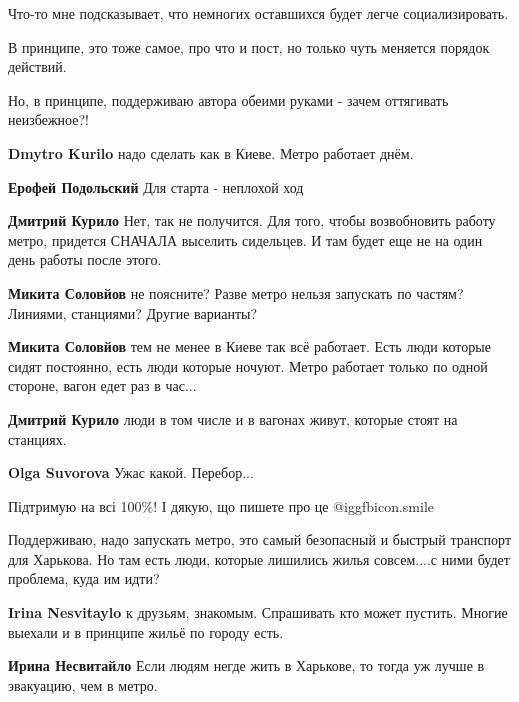 \begin{itemize}
Что-то мне подсказывает, что немногих оставшихся будет легче социализировать.

В принципе, это тоже самое, про что и пост, но только чуть меняется порядок
действий.

Но, в принципе, поддерживаю автора обеими руками - зачем оттягивать
неизбежное?!

\begin{itemize} %
\textbf{Dmytro Kurilo} надо сделать как в Киеве. Метро работает днём.

\textbf{Ерофей Подольский} Для старта - неплохой ход

\textbf{Дмитрий Курило} Нет, так не получится. Для того, чтобы возвобновить работу метро, придется СНАЧАЛА выселить сидельцев. И там будет еще не на один день работы после этого.

\textbf{Микита Соловйов} не поясните? Разве метро нельзя запускать по частям? Линиями, станциями? Другие варианты?

\textbf{Микита Соловйов} тем не менее в Киеве так всё работает. Есть люди которые сидят постоянно, есть люди которые ночуют. Метро работает только по одной стороне, вагон едет раз в час...

\textbf{Дмитрий Курило} люди в том числе и в вагонах живут, которые стоят на станциях.

\textbf{Olga Suvorova} Ужас какой. Перебор...
\end{itemize} %

Підтримую на всі 100\%! І дякую, що пишете про це  @igg{fbicon.smile} 


Поддерживаю, надо запускать метро, это самый безопасный и быстрый транспорт для
Харькова. Но там есть люди, которые лишились жилья совсем....с ними будет
проблема, куда им идти?

\begin{itemize} %
\textbf{Irina Nesvitaylo} к друзьям, знакомым. Спрашивать кто может пустить. Многие выехали и в принципе жильё по городу есть.

\textbf{Ирина Несвитайло} Если людям негде жить в Харькове, то тогда уж лучше в эвакуацию, чем в метро.
\end{itemize} %



\end{itemize}
